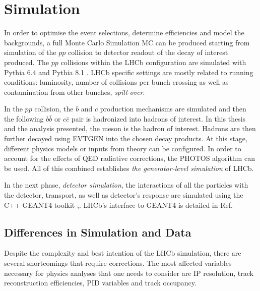 \section{Simulation }
\label{simulationchap}
In order to optimise the event selections, determine efficiencies and model the backgrounds, a full Monte Carlo Simulation \Gls{MC} can be produced starting from simulation of the $pp$ collision to detector readout of the decay of interest produced. 
The $pp$ collisions within the \Gls{LHCb} configuration \cite{Belyaev:2011zza} are simulated with Pythia 6.4 \cite{pythia6} and Pythia 8.1 \cite{pythia8}. \Gls{LHCb} specific settings are mostly related to running conditions: luminosity, number of collisions per bunch crossing as well as contamination from other bunches, \textit{spill-over}. 

In the $pp$ collision, the $b$ and $c$ production mechanisms are simulated and then the following $b\bar{b}$ or $c\bar{c}$ pair is hadronized into hadrons of interest. In this thesis and the analysis presented, the \Bp meson is the hadron of interest. Hadrons are then further decayed using EVTGEN \cite{Lange:2001uf} into the chosen decay products. At this stage, different physics models or inputs from theory can be configured. %
In order to account for the effects of \Gls{QED} radiative corrections, the PHOTOS \cite{photos} algorithm can be used. All of this combined establishes \textit{the generator-level simulation} of LHCb.


In the next phase, \textit{detector simulation}, the interactions of \DIFdelbegin {}\DIFdelend all the particles with the detector, transport, as well as detector's response are simulated using the C++ GEANT4 toolkit \cite{Geant4},\cite{Agostinelli:2002hh}. \Gls{LHCb}'s interface to GEANT4 is detailed in Ref\cite{Clemencic:2011zza}. 

\subsection{Differences in Simulation and Data}
\label{detpid}
Despite the complexity and best intention of the \Gls{LHCb} simulation, there are several shortcomings that require corrections.
The most affected variables necessary for physics analyses that one needs to consider are \Gls{IP} resolution, track reconstruction efficiencies, \Gls{PID} variables and track occupancy.


